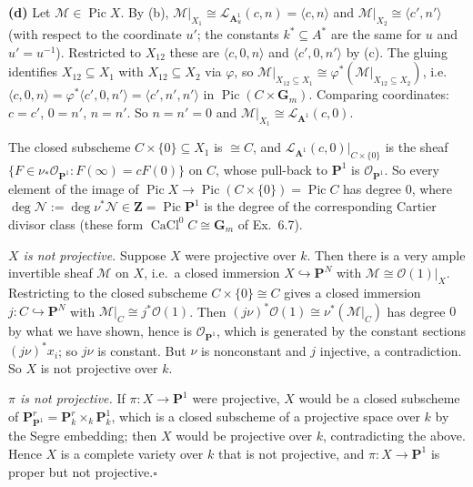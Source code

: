 \documentclass[11pt]{article}
\begin{document}
\textbf{(d)} Let $\mathcal M\in\operatorname{Pic}X$. By (b), $\mathcal M|_{X_1}\cong\mathcal L_{\mathbf A^1_u}(c,n)=\langle c,n\rangle$ and $\mathcal M|_{X_2}\cong\langle c',n'\rangle$ (with respect to the coordinate $u'$; the constants $k^*\subseteq A^*$ are the same for $u$ and $u'=u^{-1}$). Restricted to $X_{12}$ these are $\langle c,0,n\rangle$ and $\langle c',0,n'\rangle$ by (c). The gluing identifies $X_{12}\subseteq X_1$ with $X_{12}\subseteq X_2$ via $\varphi$, so $\mathcal M|_{X_{12}\subseteq X_1}\cong\varphi^*(\mathcal M|_{X_{12}\subseteq X_2})$, i.e.\ $\langle c,0,n\rangle=\varphi^*\langle c',0,n'\rangle=\langle c',n',n'\rangle$ in $\operatorname{Pic}(C\times\mathbf G_m)$. Comparing coordinates: $c=c'$, $0=n'$, $n=n'$. So $n=n'=0$ and $\mathcal M|_{X_1}\cong\mathcal L_{\mathbf A^1}(c,0)$.

The closed subscheme $C\times\{0\}\subseteq X_1$ is $\cong C$, and $\mathcal L_{\mathbf A^1}(c,0)|_{C\times\{0\}}$ is the sheaf $\{F\in\nu_*\mathcal O_{\mathbf P^1}:F(\infty)=cF(0)\}$ on $C$, whose pull-back to $\mathbf P^1$ is $\mathcal O_{\mathbf P^1}$. So every element of the image of $\operatorname{Pic}X\to\operatorname{Pic}(C\times\{0\})=\operatorname{Pic}C$ has degree $0$, where $\deg\mathcal N:=\deg\nu^*\mathcal N\in\mathbf Z=\operatorname{Pic}\mathbf P^1$ is the degree of the corresponding Cartier divisor class (these form $\operatorname{CaCl}^0C\cong\mathbf G_m$ of Ex.~6.7).

\emph{$X$ is not projective.} Suppose $X$ were projective over $k$. Then there is a very ample invertible sheaf $\mathcal M$ on $X$, i.e.\ a closed immersion $X\hookrightarrow\mathbf P^N$ with $\mathcal M\cong\mathcal O(1)|_X$. Restricting to the closed subscheme $C\times\{0\}\cong C$ gives a closed immersion $j:C\hookrightarrow\mathbf P^N$ with $\mathcal M|_C\cong j^*\mathcal O(1)$. Then $(j\nu)^*\mathcal O(1)\cong\nu^*(\mathcal M|_C)$ has degree $0$ by what we have shown, hence is $\mathcal O_{\mathbf P^1}$, which is generated by the constant sections $(j\nu)^*x_i$; so $j\nu$ is constant. But $\nu$ is nonconstant and $j$ injective, a contradiction. So $X$ is not projective over $k$.

\emph{$\pi$ is not projective.} If $\pi:X\to\mathbf P^1$ were projective, $X$ would be a closed subscheme of $\mathbf P^r_{\mathbf P^1}=\mathbf P^r_k\times_k\mathbf P^1_k$, which is a closed subscheme of a projective space over $k$ by the Segre embedding; then $X$ would be projective over $k$, contradicting the above. Hence $X$ is a complete variety over $k$ that is not projective, and $\pi:X\to\mathbf P^1$ is proper but not projective.\hfill$\square$
\end{document}
